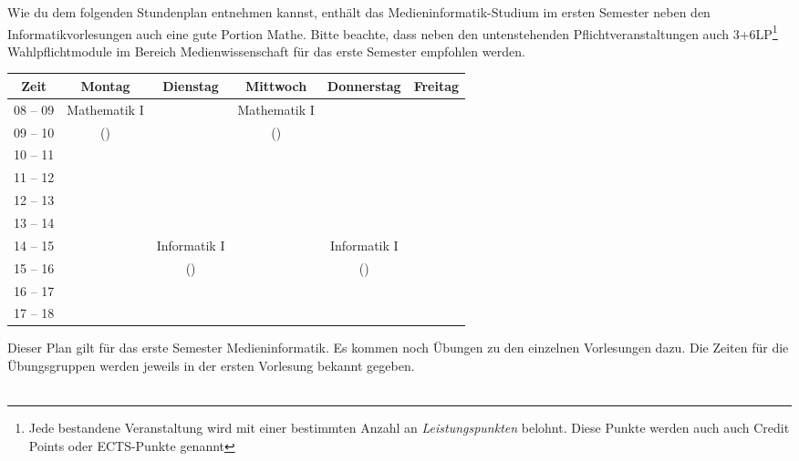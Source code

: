 Wie du dem folgenden Stundenplan entnehmen kannst, enthält das Medieninformatik-Studium im ersten
Semester neben den Informatikvorlesungen auch eine gute Portion Mathe. Bitte beachte, dass neben den untenstehenden Pflichtveranstaltungen auch 3+6LP\footnote{Jede bestandene Veranstaltung wird mit einer bestimmten Anzahl an \emph{Leistungspunkten} belohnt. Diese Punkte werden auch auch Credit Points oder ECTS-Punkte genannt} Wahlpflichtmodule im Bereich Medienwissenschaft für das erste Semester empfohlen werden. \\
\noindent\makebox[\textwidth][c]{%
	\setlength{\fboxrule}{4pt}
	\fcolorbox{red}{white}{
		\begin{minipage}[t]{
			\textwidth}\textbf{Achtung!} Die Daten für die Vorlesungstermine können sich noch ändern. Schau am besten auf Alma (\url{https://alma.uni-tuebingen.de}), ob die Termine dort geupdatet wurden.
		\end{minipage}}}

\begin{minipage}{\textwidth}
    \footnotesize
\begin{center}
	\begin{tabular}{|c|c|c|c|c|c|}
	\hline
	 Zeit     &    Montag      	& Dienstag    	& Mittwoch    	& Donnerstag 		& Freitag 		\\ \hline\hline
	 08 -- 09 &    Mathematik I	&             	& Mathematik I	& 					&  				\\ \cline{1-1} \cline{3-3} \cline{5-6}
	 09 -- 10 &    (\Matheprof)	&             	& (\Matheprof)	& 					&  				\\ \hline
	 10 -- 11 &                	&             	&             	& 					&  				\\ \hline
	 11 -- 12 &                	&             	&             	& 					&  				\\ \hline
	 12 -- 13 &                	&             	&             	& 					&  				\\ \hline
	 13 -- 14 &                	&             	&             	& 					&  				\\ \hline
	 14 -- 15 &                	& Informatik I	&             	& Informatik I 		&  				\\ \cline{1-2} \cline{4-4}
	 15 -- 16 &                	& (\Infoprof) 	&             	& (\Infoprof) 		&  				\\ \hline
	 16 -- 17 &                	&             	&             	& 					&  				\\ \hline
	 17 -- 18 &                	&             	&             	& 					&  				\\ \hline
	\end{tabular}

\end{center}
\end{minipage}

Dieser Plan gilt für das erste Semester Medieninformatik. 
Es kommen noch Übungen zu den einzelnen Vorlesungen dazu. Die Zeiten für die Übungsgruppen werden jeweils in der ersten Vorlesung bekannt gegeben. \\ \\
